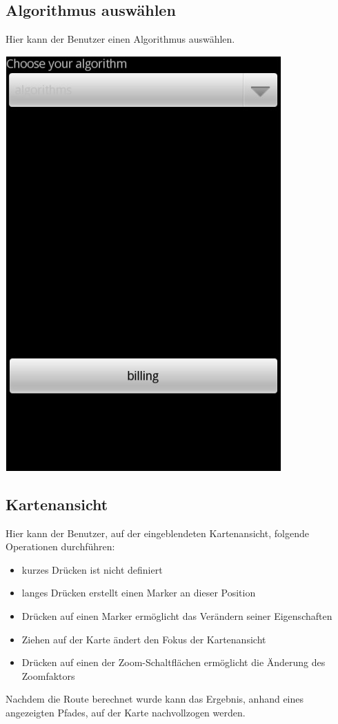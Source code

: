 \documentclass[a4paper,10pt,titlepage]{article}
\begin{document}
\subsection{Algorithmus auswählen}
Hier kann der Benutzer einen Algorithmus auswählen.
\begin {center}
\includegraphics[scale=0.47]{media/android/algorithms.jpg}
\end {center}

\newpage
\subsection{Kartenansicht}
Hier kann der Benutzer, auf der eingeblendeten Kartenansicht, folgende Operationen durchführen:
\begin {itemize}
\item kurzes Drücken ist nicht definiert
\item langes Drücken erstellt einen Marker an dieser Position
\item Drücken auf einen Marker ermöglicht das Verändern seiner Eigenschaften
\item Ziehen auf der Karte ändert den Fokus der Kartenansicht
\item Drücken auf einen der Zoom-Schaltflächen ermöglicht die Änderung des Zoomfaktors
\end {itemize}
Nachdem die Route berechnet wurde kann das Ergebnis, anhand eines angezeigten Pfades, auf der Karte nachvollzogen werden.
\end{document}
